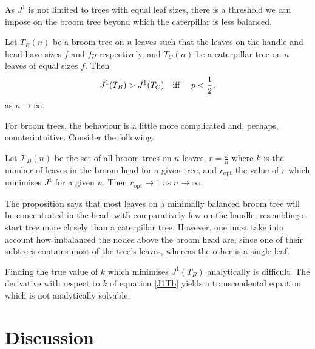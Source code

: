 As $J^1$ is not limited to trees with equal leaf sizes, there is a threshold we can impose on the broom tree beyond which the caterpillar is less balanced.

\begin{proposition}\label{p-broom-prop}
    Let $T_B(n)$ be a broom tree on $n$ leaves such that the leaves on the handle and head have sizes $f$ and $fp$ respectively, and $T_C(n)$ be a caterpillar tree on $n$ leaves of equal sizes $f$. Then
    \begin{equation}\label{p-broom-cond}
        J^1(T_B) > J^1(T_C) \text{\quad iff \quad} p<\frac{1}{2},
    \end{equation}
    as $n\to\infty$.
\end{proposition}

For broom trees, the behaviour is a little more complicated and, perhaps, counterintuitive. Consider the following.
\begin{proposition}\label{ropt_prop}
    Let $\mathcal{T}_B(n)$ be the set of all broom trees on $n$ leaves, $r = \frac{k}{n}$ where $k$ is the number of leaves in the broom head for a given tree, and $r_\text{opt}$ the value of $r$ which minimises $J^1$ for a given $n$. Then $r_\text{opt}\to 1$ as $n\to\infty$.
\end{proposition}
The proposition says that most leaves on a minimally balanced broom tree will be concentrated in the head, with comparatively few on the handle, resembling a start tree more closely than a caterpillar tree. However, one must take into account how imbalanced the nodes above the broom head are, since one of their subtrees contains most of the tree's leaves, whereas the other is a single leaf. 

\par 

Finding the true value of $k$ which minimises $J^1(T_B)$ analytically is difficult. The derivative with respect to $k$ of equation \eqref{J1Tb} yields a transcendental equation which is not analytically solvable.
    
\section{Discussion}

